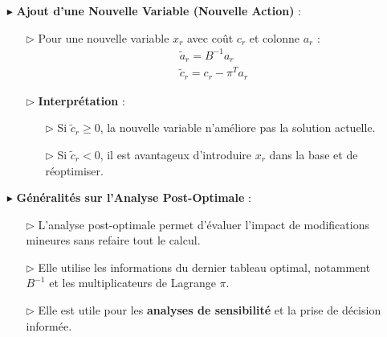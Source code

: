 \documentclass{report}
\begin{document}
\begin{multicols*}{2}
\begin{itemize}
    \item[$\blacktriangleright$] \textbf{Ajout d'une Nouvelle Variable (Nouvelle Action)} :
    \begin{itemize}
        \item[$\rhd$] Pour une nouvelle variable \( x_r \) avec coût \( c_r \) et colonne \( a_r \) :
        \begin{align*}
            &\boxed{\tilde{a}_r = B^{-1} a_r} \\
            &\boxed{\tilde{c}_r = c_r - \pi^T a_r}
        \end{align*}
        \item[$\rhd$] \textbf{Interprétation} :
        \begin{itemize}
            \item[$\rhd$] Si \( \tilde{c}_r \geq 0 \), la nouvelle variable n'améliore pas la solution actuelle.
            \item[$\rhd$] Si \( \tilde{c}_r < 0 \), il est avantageux d'introduire \( x_r \) dans la base et de réoptimiser.
        \end{itemize}
    \end{itemize}

    \item[$\blacktriangleright$] \textbf{Généralités sur l'Analyse Post-Optimale} :
    \begin{itemize}
        \item[$\rhd$] L'analyse post-optimale permet d'évaluer l'impact de modifications mineures sans refaire tout le calcul.
        \item[$\rhd$] Elle utilise les informations du dernier tableau optimal, notamment \( B^{-1} \) et les multiplicateurs de Lagrange \( \pi \).
        \item[$\rhd$] Elle est utile pour les \textbf{analyses de sensibilité} et la prise de décision informée.
    \end{itemize}
\end{itemize}
\end{multicols*}
\end{document}
